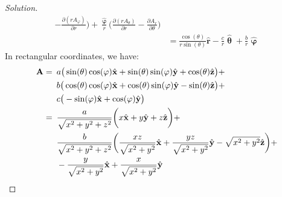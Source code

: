 \begin{proof}[Solution]
\begin{align*}
                        -\frac{\partial(rA_{\varphi})}{\partial{r}}
                    \bigg)
                    +\frac{\hat{\boldsymbol{\upvarphi}}}{r}
                    \bigg(
                        \frac{\partial(rA_{\theta})}{\partial{r}}
                        -\frac{\partial{A_{r}}}{\partial\theta}
                    \bigg)\\
                    &=\frac{\cos(\theta)}{r\sin(\theta)}\hat{\mathbf{r}}
                    -\frac{c}{r}\hat{\boldsymbol{\uptheta}}
                    +\frac{b}{r}\hat{\boldsymbol{\upvarphi}}
                \end{align*}
                In rectangular coordinates, we have:
                \begin{align*}
                    \mathbf{A}=\hspace{0.5em}
                    &a\big(\sin(\theta)\cos(\varphi)
                     \hat{\mathbf{x}}
                    +\sin(\theta)\sin(\varphi)
                     \hat{\mathbf{y}}
                    +\cos(\theta)\hat{\mathbf{z}}\big)+\\
                    &b\big(
                        \cos(\theta)\cos(\varphi)
                        \hat{\mathbf{x}}
                        +\cos(\theta)\sin(\varphi)
                        \hat{\mathbf{y}}
                        -\sin(\theta)\hat{\mathbf{z}}
                    \big)+\\
                    &c\big(
                        -\sin(\varphi)\hat{\mathbf{x}}
                        +\cos(\varphi)\hat{\mathbf{y}}
                    \big)\\
                    =\hspace{0.5em}
                    &\frac{a}{\sqrt{x^{2}+y^{2}+z^{2}}}
                    \bigg(
                        x\hat{\mathbf{x}}
                        +y\hat{\mathbf{y}}
                        +z\hat{\mathbf{z}}
                    \bigg)+\\
                    &\frac{b}{\sqrt{x^{2}+y^{2}+z^{2}}}
                    \bigg(
                        \frac{xz}{\sqrt{x^{2}+y^{2}}}
                        \hat{\mathbf{x}}
                        +\frac{yz}{\sqrt{x^{2}+y^{2}}}
                        \hat{\mathbf{y}}
                        -\sqrt{x^{2}+y^{2}}\hat{\mathbf{z}}
                    \bigg)+\\
                    &-\frac{y}{\sqrt{x^{2}+y^{2}}}\hat{\mathbf{x}}
                    +\frac{x}{\sqrt{x^{2}+y^{2}}}\hat{\mathbf{y}}\\

\end{align*}
\end{proof}
